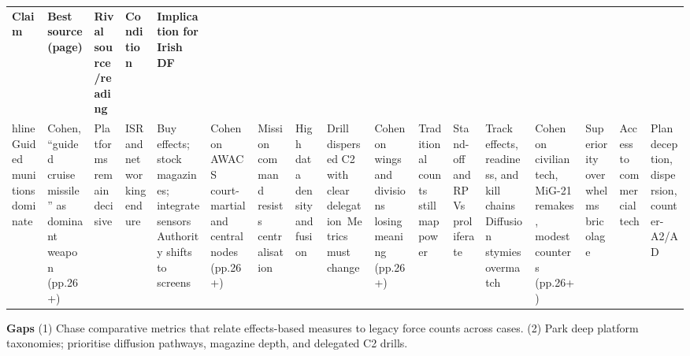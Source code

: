 \usepackage{array}
\begin{tabular}{p{3.2cm}p{4.2cm}p{3.6cm}p{3.2cm}p{4.2cm}}
	\textbf{Claim} & \textbf{Best source (page)} & \textbf{Rival source/reading} & \textbf{Condition} & \textbf{Implication for Irish DF}\\hline
	Guided munitions dominate & Cohen, “guided cruise missile” as dominant weapon (pp.26+) & Platforms remain decisive & ISR and networking endure & Buy effects; stock magazines; integrate sensors\
	Authority shifts to screens & Cohen on AWACS court-martial and central nodes (pp.26+) & Mission command resists centralisation & High data density and fusion & Drill dispersed C2 with clear delegation\
	Metrics must change & Cohen on wings and divisions losing meaning (pp.26+) & Traditional counts still map power & Stand-off and RPVs proliferate & Track effects, readiness, and kill chains\
	Diffusion stymies overmatch & Cohen on civilian tech, MiG-21 remakes, modest counters (pp.26+) & Superiority overwhelms bricolage & Access to commercial tech & Plan deception, dispersion, counter-A2/AD\
\end{tabular}

\textbf{Gaps}
(1) Chase comparative metrics that relate effects-based measures to legacy force counts across cases.
(2) Park deep platform taxonomies; prioritise diffusion pathways, magazine depth, and delegated C2 drills.


